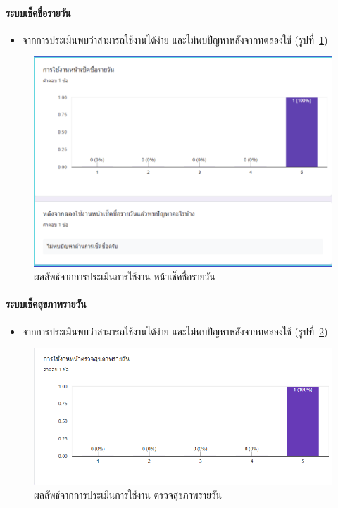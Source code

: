 \paragraph{ระบบเช็คชื่อรายวัน}
\begin{itemize}
  \item จากการประเมินพบว่าสามารถใช้งานได้ง่าย และไม่พบปัญหาหลังจากทดลองใช้ (รูปที่~\ref{fig:Eval3})
\end{itemize}
\begin{figure}
  \begin{center}
    \includegraphics[width=\linewidth]{images/eval3.png}
  \end{center}
  \caption[ผลลัพธ์จากการประเมินการใช้งาน หน้าเช็คชื่อรายวัน]{ผลลัพธ์จากการประเมินการใช้งาน หน้าเช็คชื่อรายวัน}
  \label{fig:Eval3}
\end{figure}

\paragraph{ระบบเช็คสุขภาพรายวัน}
\begin{itemize}
  \item จากการประเมินพบว่าสามารถใช้งานได้ง่าย และไม่พบปัญหาหลังจากทดลองใช้ (รูปที่~\ref{fig:Eval5})
\end{itemize}
\begin{figure}
  \begin{center}
    \includegraphics[width=\linewidth]{images/eval5.png}
  \end{center}
  \caption[ผลลัพธ์จากการประเมินการใช้งาน ตรวจสุขภาพรายวัน]{ผลลัพธ์จากการประเมินการใช้งาน ตรวจสุขภาพรายวัน}
  \label{fig:Eval5}
\end{figure}

